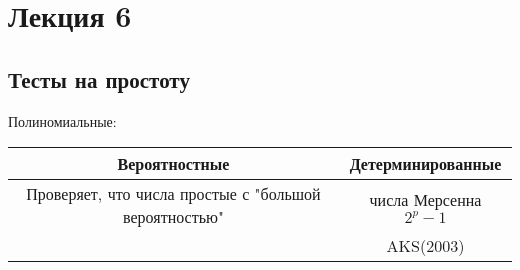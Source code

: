 \section{Лекция 6}
\subsection{Тесты на простоту}
\begin{center}
    Полиномиальные:
    ~\newline
\begin{tabular}{ |c|c| } 
 \hline
    Вероятностные & Детерминированные \\
\hline
    Проверяет, что числа простые с "большой вероятностью" & числа Мерсенна $2^{p} - 1$ \\
                                                          & AKS(2003) \\
 \hline
\end{tabular}
\end{center}
